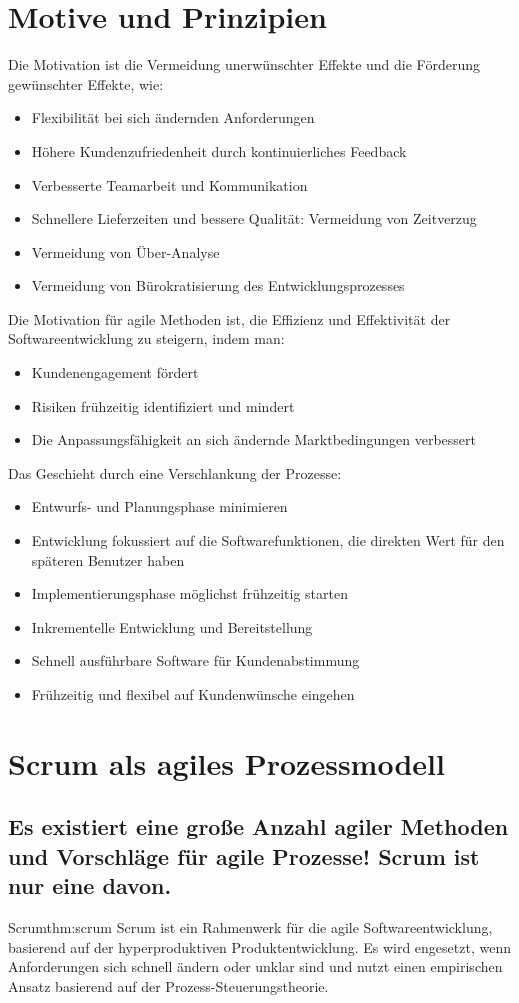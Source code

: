 \documentclass[main.tex]{subfiles}
\begin{document}
\section{Motive und Prinzipien}
Die Motivation ist die Vermeidung unerwünschter Effekte und die Förderung gewünschter Effekte, wie:
\begin{itemize}
    \item Flexibilität bei sich ändernden Anforderungen
    \item Höhere Kundenzufriedenheit durch kontinuierliches Feedback
    \item Verbesserte Teamarbeit und Kommunikation
    \item Schnellere Lieferzeiten und bessere Qualität: Vermeidung von Zeitverzug 
    \item Vermeidung von Über-Analyse
    \item Vermeidung von Bürokratisierung des Entwicklungsprozesses
\end{itemize}
Die Motivation für agile Methoden ist, die Effizienz und Effektivität der Softwareentwicklung zu steigern, indem man:
\begin{itemize}
    \item Kundenengagement fördert
    \item Risiken frühzeitig identifiziert und mindert
    \item Die Anpassungsfähigkeit an sich ändernde Marktbedingungen verbessert
\end{itemize}
Das Geschieht durch eine Verschlankung der Prozesse: 
\begin{itemize}
    \item Entwurfs- und Planungsphase minimieren
    \item Entwicklung fokussiert auf die Softwarefunktionen, die direkten Wert für den späteren Benutzer haben
    \item Implementierungsphase möglichst frühzeitig starten
    \item Inkrementelle Entwicklung und Bereitstellung
    \item Schnell ausführbare Software für Kundenabstimmung
    \item Frühzeitig und flexibel auf Kundenwünsche eingehen
\end{itemize}
\newpage
\section{Scrum als agiles Prozessmodell}
\subsection*{Es existiert eine große Anzahl agiler Methoden und Vorschläge für agile Prozesse! Scrum ist nur eine davon. }
\begin{myTheorem}{Scrum}{thm:scrum}
Scrum ist ein Rahmenwerk für die agile Softwareentwicklung, basierend auf der hyperproduktiven Produktentwicklung. Es wird engesetzt, wenn Anforderungen sich schnell ändern oder unklar sind und nutzt einen empirischen Ansatz basierend auf der Prozess-Steuerungstheorie. 
\end{myTheorem}
\end{document}
